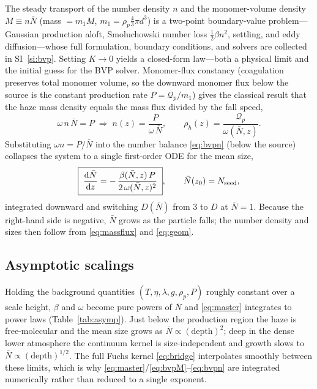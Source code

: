 \documentclass[11pt]{article}
\newcommand{\Nbar}{\bar{N}}
\newcommand{\Df}{D}
\newcommand{\dd}{\mathrm{d}}
\newcommand{\Qprod}{\mathcal{Q}_p}
\begin{document}
The steady transport of the number density $n$ and the monomer-volume density
$M\equiv n\Nbar$ (mass $=m_1 M$, $m_1=\rho_p\tfrac43\pi d^3$) is a two-point
boundary-value problem---Gaussian production aloft, Smoluchowski number loss
$\tfrac12\beta n^2$, settling, and eddy diffusion---whose full formulation,
boundary conditions, and solvers are collected in SI~\ref{si:bvp}.
Setting $K\to0$ yields a closed-form law---both a physical limit and the initial
guess for the BVP solver. Monomer-flux constancy (coagulation preserves total
monomer volume, so the downward monomer flux below the source is the constant
production rate $P=\Qprod/m_1$) gives the classical result that
the haze mass density equals the mass flux divided by the fall speed,
\begin{equation}
  \omega\, n\,\Nbar = P
  \;\Longrightarrow\;
  n(z)=\frac{P}{\omega\,\Nbar},
  \qquad
  \rho_h(z)=\frac{\Qprod}{\omega(\Nbar,z)}.
  \label{eq:massflux}
\end{equation}
Substituting $\omega n = P/\Nbar$ into the number balance \eqref{eq:bvpn} (below the source)
collapses the system to a single first-order ODE for the mean size,
\begin{equation}
  \boxed{\;
  \frac{\dd \Nbar}{\dd z}
    = -\,\frac{\beta(\Nbar,z)\,P}{2\,\omega(\Nbar,z)^2}\;},
  \qquad \Nbar(z_0)=N_{\rm seed},
  \label{eq:master}
\end{equation}
integrated downward and switching $\Df(\Nbar)$ from $3$ to $\Df$ at $\Nbar=1$.
Because the right-hand side is negative, $\Nbar$ grows as the particle falls; the
number density and sizes then follow from \eqref{eq:massflux} and
\eqref{eq:geom}.

\subsection{Asymptotic scalings}

Holding the background quantities $(T,\eta,\lambda,g,\rho_p,P)$ roughly constant
over a scale height, $\beta$ and $\omega$ become pure powers of $\Nbar$ and
\eqref{eq:master} integrates to power laws (Table~\ref{tab:asymp}). Just below
the production region the haze is free-molecular and the mean size grows as
$\Nbar\propto(\text{depth})^2$; deep in the dense lower atmosphere the continuum
kernel is size-independent and growth slows to
$\Nbar\propto(\text{depth})^{1/2}$. The full Fuchs kernel \eqref{eq:bridge}
interpolates smoothly between these limits, which is why
\eqref{eq:master}/\eqref{eq:bvpM}--\eqref{eq:bvpn} are integrated numerically
rather than reduced to a single exponent.
\end{document}
